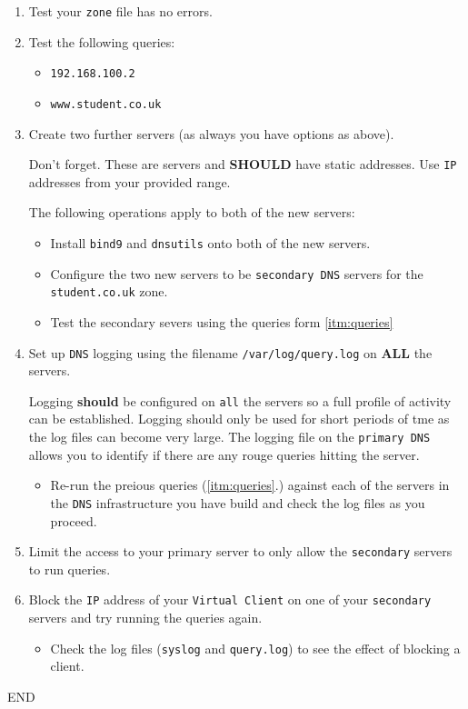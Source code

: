 \documentclass[11pt]{article}
\begin{document}
\begin{enumerate}
\begin{itemize}
\begin{itemize}
            \end{itemize}
        \end{itemize}
    \item Test your \texttt{zone} file has no errors.
    \item \label{itm:queries} Test the following queries:
        \begin{itemize}
            \item \texttt{192.168.100.2}
            \item \texttt{www.student.co.uk}
        \end{itemize}
    \item Create two further servers (as always you have options as above).
        \begin{tcolorbox}[title={\textbf{NOTE:}}]
            \noindent Don't forget. These are servers and \textbf{SHOULD} have static addresses. Use \texttt{IP} addresses from your provided range.
        \end{tcolorbox}
        \noindent The following operations apply to both of the new servers:
        \begin{itemize}
            \item Install \texttt{bind9} and \texttt{dnsutils} onto both of the new servers.
            \item Configure the two new servers to be \texttt{secondary DNS} servers for the \texttt{student.co.uk} zone.
            \item Test the secondary severs using the queries form \ref{itm:queries}
        \end{itemize}
    \item Set up \texttt{DNS} logging using the filename \texttt{/var/log/query.log} on \textbf{ALL} the servers.
        \begin{tcolorbox}[title={\textbf{NOTE:}}]
            \noindent Logging \textbf{should} be configured on \texttt{all} the servers so a full profile of activity can be established. Logging should only be used for short periods of tme as the log files can become very large. The logging file on the \texttt{primary DNS} allows you to identify if there are any rouge queries hitting the server.
        \end{tcolorbox}
        \begin{itemize}
            \item Re-run the preious queries (\ref{itm:queries}.) against each of the servers in the \texttt{DNS} infrastructure you have build and check the log files as you proceed.
        \end{itemize}
    \item Limit the access to your primary server to only allow the \texttt{secondary} servers to run queries.
    \item Block the \texttt{IP} address of your \texttt{Virtual Client} on one of your \texttt{secondary} servers and try running the queries again.
        \begin{itemize}
            \item Check the log files (\texttt{syslog} and \texttt{query.log}) to see the effect of blocking a client.
        \end{itemize}
\end{enumerate}    
END
\end{document}
